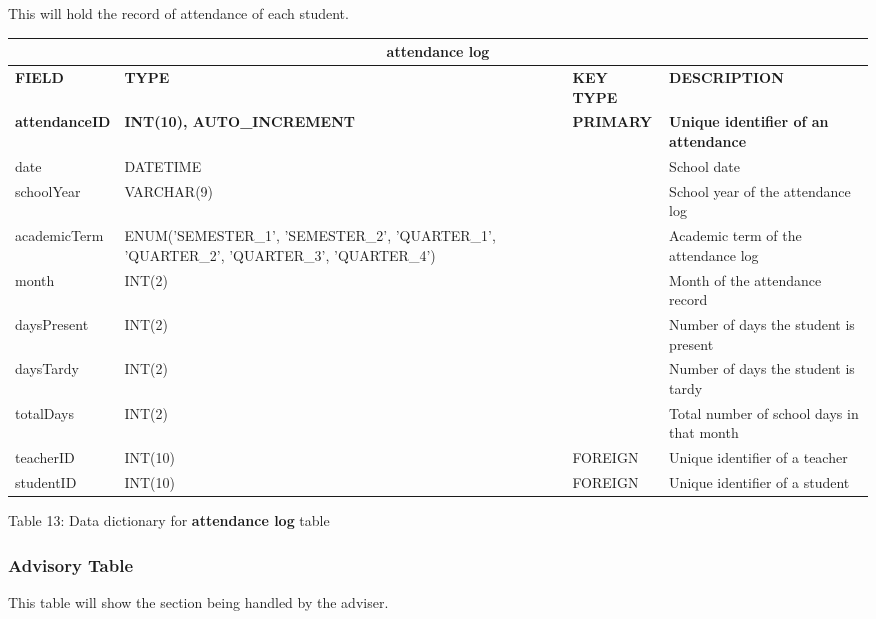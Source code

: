 \documentclass[11pt,a4paper,titlepage]{article}
\begin{document}
This will hold the record of attendance of each student.

\vspace{1cm}
\begin{longtable}{ |p{2.5cm}|p{4.5cm}|p{2.5cm}|p{3cm}|  }
    \hline
    \multicolumn{4}{|c|}{\textbf{attendance log}} \\
    \hline
    \textbf{FIELD}&\textbf{TYPE}&\textbf{KEY TYPE}&\textbf{DESCRIPTION}\\
    \hline
    \textbf{attendanceID}  & \textbf{INT(10), AUTO\_INCREMENT} & \textbf{PRIMARY} & \textbf{Unique identifier of an attendance}\\ \hline
    date   & DATETIME   & & School date\\ \hline
    schoolYear   & VARCHAR(9)   & & School year of the attendance log\\ \hline
    academicTerm   & ENUM('SEMESTER\_1', 'SEMESTER\_2', 'QUARTER\_1', 'QUARTER\_2', 'QUARTER\_3', 'QUARTER\_4') &  & Academic term of the attendance log\\ \hline
    month   & INT(2) &  & Month of the attendance record\\ \hline
    daysPresent   & INT(2) &  & Number of days the student is present\\ \hline
    daysTardy   & INT(2) &  & Number of days the student is tardy\\ \hline
    totalDays   & INT(2) &  & Total number of school days in that month\\ \hline
    teacherID   & INT(10)   & FOREIGN & Unique identifier of a teacher\\ \hline
    studentID   & INT(10)   & FOREIGN & Unique identifier of a student\\ \hline
\end{longtable}

\vspace{.5cm}
\begin{center}
    Table 13: Data dictionary for \textbf{attendance log} table
\end{center}

\newpage

\subsubsection{Advisory Table}

This table will show the section being handled by the adviser.
\end{document}
